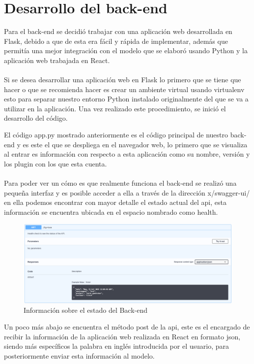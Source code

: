 \documentclass[12pt, a4paper, titlepage]{report}
\begin{document}
\section{Desarrollo del back-end}

Para el back-end se decidió trabajar con una aplicación web desarrollada en Flask, debido a que de esta era fácil y rápida de implementar, además que permitía una mejor integración con el modelo que se elaboró usando Python y la aplicación web trabajada en React.\\\\
Si se desea desarrollar una aplicación web en Flask lo primero que se tiene que hacer o que se recomienda hacer es crear un ambiente virtual usando virtualenv esto para separar nuestro entorno Python instalado originalmente del que se va a utilizar en la aplicación. Una vez realizado este procedimiento, se inició el desarrollo del código.
\begin{center}
	
\end{center}
El código app.py mostrado anteriormente es el código principal de nuestro back-end y es este el que se despliega en el navegador web, lo primero que se visualiza al entrar es información con respecto a esta aplicación como su nombre, versión y los plugin con los que esta cuenta.\\\\
Para poder ver un cómo es que realmente funciona el back-end se realizó una pequeña interfaz y es posible acceder a ella a través de la dirección x/swagger-ui/ en ella podemos encontrar con mayor detalle el estado actual del api, esta información se encuentra ubicada en el espacio nombrado como health.
\begin{figure}[H]
	\includegraphics[width=13.5cm]{./imagenes/Desarrollo/BackEnd/Health.png}
	\centering 
	\caption{Información sobre el estado del Back-end}
\end{figure}
Un poco más abajo se encuentra el método post de la api, este es el encargado de recibir la información de la aplicación web realizada en React en formato json, siendo más específicos la palabra en inglés introducida por el usuario, para posteriormente enviar esta información al modelo.
\end{document}
